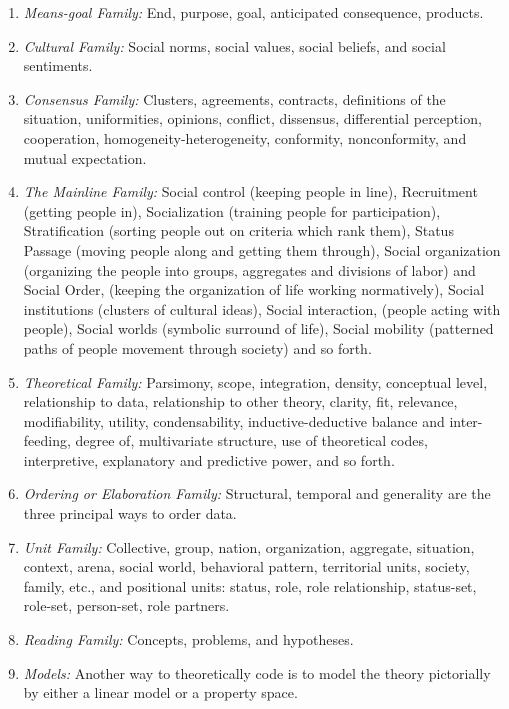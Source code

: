\begin{enumerate}
\item \textit{Means-goal Family:} End, purpose, goal, anticipated consequence, products.
\item \textit{Cultural Family:} Social norms, social values, social beliefs, and social sentiments.
\item \textit{Consensus Family:} Clusters, agreements, contracts, definitions of the situation, uniformities, opinions, conflict, dissensus, differential perception, cooperation, homogeneity-heterogeneity, conformity, nonconformity, and mutual expectation.
\item \textit{The Mainline Family:} Social control (keeping people in line), Recruitment (getting people in), Socialization (training people for participation), Stratification (sorting people out on criteria which rank them), Status Passage (moving people along and getting them through), Social organization (organizing the people into groups, aggregates and divisions of labor) and Social Order, (keeping the organization of life working normatively), Social institutions (clusters of cultural ideas), Social interaction, (people acting with people), Social worlds (symbolic surround of life), Social mobility (patterned paths of people movement through society) and so forth.
\item \textit{Theoretical Family:} Parsimony, scope, integration, density, conceptual level, relationship to data, relationship to other theory, clarity, fit, relevance, modifiability, utility, condensability, inductive-deductive balance and inter-feeding, degree of, multivariate structure, use of theoretical codes, interpretive, explanatory and predictive power, and so forth.
\item \textit{Ordering or Elaboration Family:} Structural, temporal and generality are the three principal ways to order data.
\item \textit{Unit Family:} Collective, group, nation, organization, aggregate, situation, context, arena, social world, behavioral pattern, territorial units, society, family, etc., and positional units: status, role, role relationship, status-set, role-set, person-set, role partners. 
\item \textit{Reading Family:} Concepts, problems, and hypotheses. 
\item \textit{Models:} Another way to theoretically code is to model the theory pictorially by either a linear model or a property space. \cite{GlaserTheoreticalSensitivity}
\end{enumerate}


